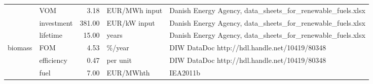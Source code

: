 \begin{longtable}{p{5cm}p{3cm}rp{3cm}p{11cm}}
                      & VOM &           3.18 &                     EUR/MWh input &                                                                                                                                                                                                                                                                           Danish Energy Agency, data\_sheets\_for\_renewable\_fuels.xlsx \\
                      & investment &         381.00 &                      EUR/kW input &                                                                                                                                                                                                                                                                           Danish Energy Agency, data\_sheets\_for\_renewable\_fuels.xlsx \\
                      & lifetime &          15.00 &                             years &                                                                                                                                                                                                                                                                           Danish Energy Agency, data\_sheets\_for\_renewable\_fuels.xlsx \\
biomass & FOM &           4.53 &                            \%/year &                                                                                                                                                                                                                                                                                        DIW DataDoc http://hdl.handle.net/10419/80348 \\
                      & efficiency &           0.47 &                          per unit &                                                                                                                                                                                                                                                                                        DIW DataDoc http://hdl.handle.net/10419/80348 \\
                      & fuel &           7.00 &                         EUR/MWhth &                                                                                                                                                                                                                                                                                                                             IEA2011b \\

\end{longtable}
